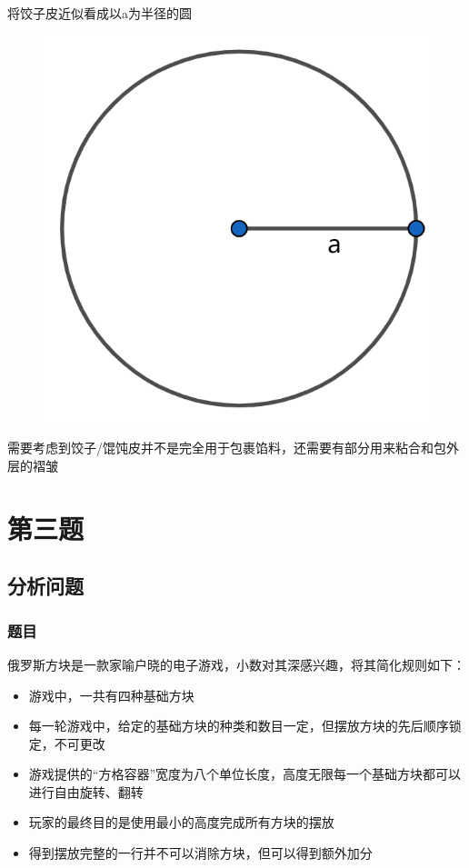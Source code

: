 \documentclass[lang=cn,a4paper]{elegantpaper}
\begin{document}
    将饺子皮近似看成以a为半径的圆
    \begin{figure}[H]
        \centering
        \includegraphics[scale=0.4]{circle.png}
    \end{figure}
    需要考虑到饺子/馄饨皮并不是完全用于包裹馅料，还需要有部分用来粘合和包外层的褶皱

    \clearpage
    \section{第三题}
    \subsection{分析问题}
    \subsubsection*{题目}
    俄罗斯方块是一款家喻户晓的电子游戏，小数对其深感兴趣，将其简化规则如下：
    \begin{itemize}
        \item 游戏中，一共有四种基础方块
        \item 每一轮游戏中，给定的基础方块的种类和数目一定，但摆放方块的先后顺序锁定，不可更改
        \item 游戏提供的“方格容器”宽度为八个单位长度，高度无限每一个基础方块都可以进行自由旋转、翻转
        \item 玩家的最终目的是使用最小的高度完成所有方块的摆放
        \item 得到摆放完整的一行并不可以消除方块，但可以得到额外加分
    \end{itemize}
\end{document}
